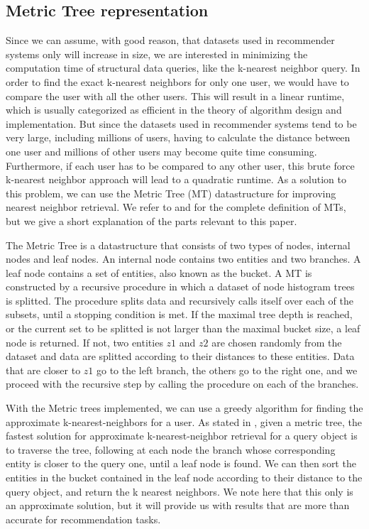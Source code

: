 \subsection{Metric Tree representation}
  Since we can assume, with good reason, that datasets used in recommender systems only will increase in size, we are interested in minimizing the computation time of structural data queries, like the k-nearest neighbor query.
  In order to find the exact k-nearest neighbors for only one user, we would have to compare the user with all the other users.
  This will result in a linear runtime, which is usually categorized as efficient in the theory of algorithm design and implementation. But since the datasets used in recommender systems tend to be very large, including millions of users, having to calculate the distance between one user and millions of other users may become quite time consuming.
  Furthermore, if each user has to be compared to any other user, this brute force k-nearest neighbor approach will lead to a quadratic runtime.
  As a solution to this problem, we can use the Metric Tree (MT) datastructure for improving nearest neighbor retrieval.
  We refer to \cite{jaeger2019counts} and \cite{uhlmann1991} for the complete definition of MTs, but we give a short explanation of the parts relevant to this paper.

  The Metric Tree is a datastructure that consists of two types of nodes, internal nodes and leaf nodes. An internal node contains two entities and two branches. A leaf node contains a set of entities, also known as the bucket.
  A MT is constructed by a recursive procedure in which a dataset of node histogram trees is splitted. The procedure splits data and recursively calls itself over each of the subsets, until a stopping condition is met.
  If the maximal tree depth is reached, or the current set to be splitted is not larger than the maximal bucket size, a leaf node is returned.
  If not, two entities $z1$ and $z2$ are chosen randomly from the dataset and data are splitted according to their distances to these entities. Data that are closer to $z1$ go to the left branch, the others go to the right one, and we proceed with the recursive step by calling the procedure on each of the branches.

  With the Metric trees implemented, we can use a greedy algorithm for finding the approximate k-nearest-neighbors for a user.
  As stated in \cite{jaeger2019counts}, given a metric tree, the fastest solution for approximate k-nearest-neighbor retrieval for a query object is to traverse the tree, following at each node the branch whose corresponding entity is closer to the query one, until a leaf node is found.
  We can then sort the entities in the bucket contained in the leaf node according to their distance to the query object, and return the k nearest neighbors. We note here that this only is an approximate solution, but it will provide us with results that are more than accurate for recommendation tasks.
